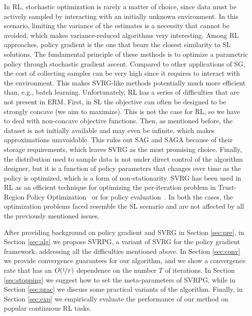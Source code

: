 \documentclass{article}
\makeatletter
\theoremstyle{remark}
\theoremstyle{definition}
\DeclareRobustCommand{\eg}{e.g.,\@\xspace}
\DeclareRobustCommand{\wrt}{w.r.t.\@\xspace}
\makeatother
\begin{document}
In RL, stochastic optimization is rarely a matter of choice, since data must be actively sampled by interacting with an initially unknown environment. In this scenario, limiting the variance of the estimates is a necessity that cannot be avoided, which makes variance-reduced algorithms very interesting.
Among RL approaches, policy gradient \cite{sutton2000policy} is the one that bears the closest similarity to SL solutions. The fundamental principle of these methods is to optimize a parametric policy through stochastic gradient ascent. Compared to other applications of SG, the cost of collecting samples can be very high since it requires to interact with the environment. This makes SVRG-like methods potentially much more efficient than, \eg batch learning.
Unfortunately, RL has a series of difficulties that are not present in ERM. First, in SL the objective can often be designed to be strongly concave (we aim to maximize). This is not the case for RL, so we have to deal with non-concave objective functions. Then, as mentioned before, the dataset is not initially available and may even be infinite, which makes approximations unavoidable. This rules out SAG and SAGA because of their storage requirements, which leaves SVRG as the most promising choice. Finally, the distribution used to sample data is not under direct control of the algorithm designer, but it is a function of policy parameters that changes over time as the policy is optimized, which is a form of non-stationarity.
SVRG has been used in RL as an efficient technique for optimizing the per-iteration problem in Trust-Region Policy Optimization~\citep{xu2017svrgtrpo} or for policy evaluation~\citep{du2017svrgpe}.
In both the cases, the optimization problems faced resemble the SL scenario and are not affected by all the previously mentioned issues.

After providing background on policy gradient and SVRG in Section \ref{sec:pre}, in Section \ref{sec:alg} we propose SVRPG, a variant of SVRG for the policy gradient framework, addressing all the difficulties mentioned above. In Section \ref{sec:conv} we provide convergence guarantees for our algorithm, and we show a convergence rate that has an $O(\nicefrac{1}{T})$ dependence on the number $T$ of iterations. In Section \ref{sec:stopping} we suggest how to set the meta-parameters of SVRPG, while in Section \ref{sec:prac} we discuss some practical variants of the algorithm. Finally, in Section \ref{sec:exp} we empirically evaluate the performance of our method on popular continuous RL tasks.
\end{document}
